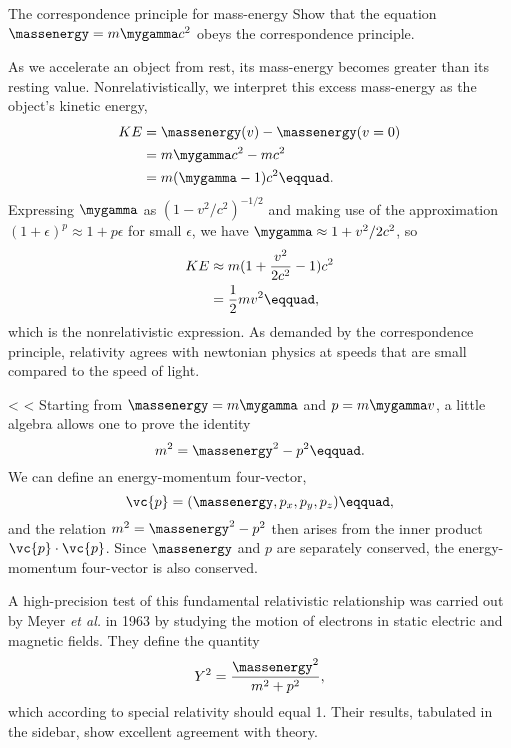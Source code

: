 \begin{eg}{The correspondence principle for mass-energy}
\egquestion Show that the equation $\massenergy=m\mygamma c^2$ obeys the correspondence principle.

\eganswer As we accelerate an object from rest, its mass-energy becomes greater than
its resting value. Nonrelativistically, we interpret this excess mass-energy as the object's
kinetic energy,
\begin{align*}
  KE   &= \massenergy(v)-\massenergy(v=0) \\
       &= m\mygamma c^2 - m c^2 \\
       &= m(\mygamma-1)c^2\eqquad.
\end{align*}
Expressing $\mygamma$ as $\left(1-v^2/c^2\right)^{-1/2}$ and making use of the
approximation $(1+\epsilon)^p\approx 1+p\epsilon$ for small $\epsilon$, we have
$\mygamma\approx 1+v^2/2c^2$, so
\begin{align*}
  KE   &\approx m(1+\frac{v^2}{2c^2}-1)c^2 \\
       &= \frac{1}{2}mv^2\eqquad,
\end{align*}
which is the nonrelativistic expression. As demanded by the correspondence principle,
relativity agrees with newtonian physics at speeds that are small compared to
the speed of light.
\end{eg}

<%
<%
Starting from $\massenergy=m\mygamma$ and $p=m\mygamma v$, a little algebra allows one to prove the identity
\begin{equation*}
  m^2 = \massenergy^2 - p^2\eqquad.
\end{equation*}
We can define an energy-momentum four-vector,
\begin{equation*}
  \vc{p} = (\massenergy,p_x,p_y,p_z)\eqquad,
\end{equation*}
and the relation $m^2 = \massenergy^2 - p^2$ then arises from the inner product $\vc{p}\cdot\vc{p}$.
Since $\massenergy$ and $p$ are separately conserved, the energy-momentum four-vector is also conserved.

A high-precision test of this fundamental relativistic relationship was carried out by Meyer \emph{et al.}
in 1963 by studying the motion of electrons in static electric and magnetic fields. They define the quantity
\begin{equation*}
  Y^2 = \frac{\massenergy^2}{m^2+p^2},
\end{equation*}
which according to special relativity should equal 1. Their results, tabulated in the sidebar,
show excellent agreement with theory.

